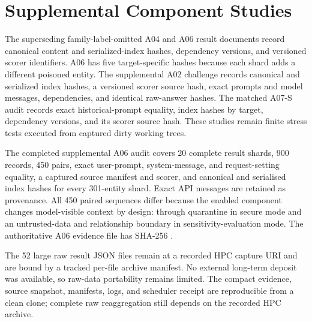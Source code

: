 \section{Supplemental Component Studies}

The superseding family-label-omitted A04 and A06 result documents record canonical content and serialized-index hashes, dependency versions, and versioned scorer identifiers. A06 has five target-specific hashes because each shard adds a different poisoned entity. The supplemental A02 challenge records canonical and serialized index hashes, a versioned scorer source hash, exact prompts and model messages, dependencies, and identical raw-answer hashes. The matched A07-S audit records exact historical-prompt equality, index hashes by target, dependency versions, and its scorer source hash. These studies remain finite stress tests executed from captured dirty working trees.

The completed supplemental A06 audit covers 20 complete result shards, 900 records, 450 pairs, exact user-prompt, system-message, and request-setting equality, a captured source manifest and scorer, and canonical and serialised index hashes for every 301-entity shard. Exact API messages are retained as provenance. All 450 paired sequences differ because the enabled component changes model-visible context by design: through quarantine in secure mode and an untrusted-data and relationship boundary in sensitivity-evaluation mode. The authoritative A06 evidence file has SHA-256 .

The 52 large raw result JSON files remain at a recorded HPC capture URI and are bound by a tracked per-file archive manifest. No external long-term deposit was available, so raw-data portability remains limited. The compact evidence, source snapshot, manifests, logs, and scheduler receipt are reproducible from a clean clone; complete raw reaggregation still depends on the recorded HPC archive.


